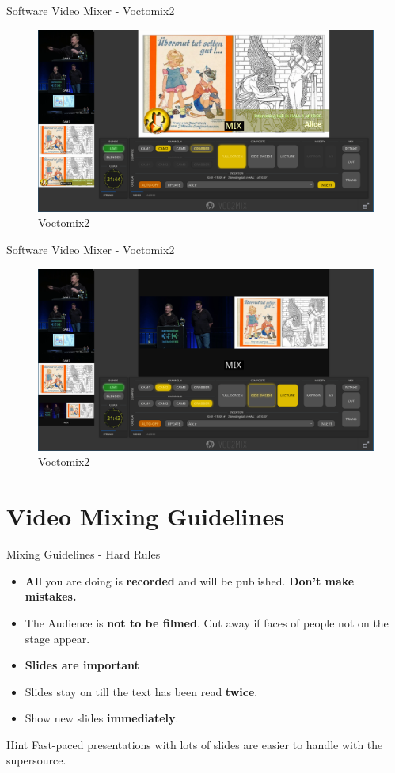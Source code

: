 \documentclass[aspectratio=169]{beamer}
\begin{document}
\begin{frame}{Software Video Mixer - Voctomix2}
	\begin{figure} 
		\centering
		\includegraphics[width=.9\textwidth]{images/voctomix2_2.png}
		\caption{Voctomix2}
	\end{figure}
\end{frame}

\begin{frame}{Software Video Mixer - Voctomix2}
	\begin{figure} 
		\centering
		\includegraphics[width=.9\textwidth]{images/voctomix2_3.png}
		\caption{Voctomix2}
	\end{figure}
\end{frame}




\section{Video Mixing Guidelines}
\begin{frame}{Mixing Guidelines - Hard Rules}
	\begin{itemize}
		\item \textbf{All} you are doing is \textbf{recorded} and will be published. \alert{\textbf{Don't make mistakes.}}
		\item The Audience is \textbf{not to be filmed}. Cut away if faces of people not on the stage appear.
		\item \textbf{Slides are important}
		\item Slides stay on till the text has been read \textbf{twice}.
		\item Show new slides \textbf{immediately}.
	\end{itemize}
	\begin{exampleblock}{Hint}
		Fast-paced presentations with lots of slides are easier to handle with the supersource.
	\end{exampleblock}
\end{frame}
\end{document}
